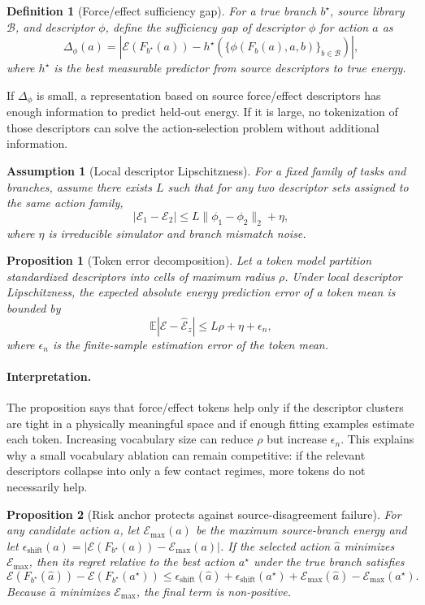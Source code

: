 \documentclass{article}
\newtheorem{proposition}{Proposition}
\newtheorem{assumption}{Assumption}
\newtheorem{definition}{Definition}
\newcommand{\energy}{\mathcal{E}}
\newcommand{\branches}{\mathcal{B}}
\newcommand{\features}{\phi}
\begin{document}
\begin{definition}[Force/effect sufficiency gap]
For a true branch $b^\star$, source library $\branches$, and descriptor $\features$, define the sufficiency gap of descriptor $\features$ for action $a$ as
\[
  \Delta_{\features}(a)
  =
  \left|
    \energy(F_{b^\star}(a))
    -
    h^\star(\{\features(F_b(a),a,b)\}_{b\in\branches})
  \right|,
\]
where $h^\star$ is the best measurable predictor from source descriptors to true energy.
\end{definition}

If $\Delta_{\features}$ is small, a representation based on source force/effect descriptors has enough information to predict held-out energy. If it is large, no tokenization of those descriptors can solve the action-selection problem without additional information.

\begin{assumption}[Local descriptor Lipschitzness]
For a fixed family of tasks and branches, assume there exists $L$ such that for any two descriptor sets assigned to the same action family,
\[
  |\energy_1-\energy_2| \leq L\|\features_1-\features_2\|_2 + \eta,
\]
where $\eta$ is irreducible simulator and branch mismatch noise.
\end{assumption}

\begin{proposition}[Token error decomposition]
Let a token model partition standardized descriptors into cells of maximum radius $\rho$. Under local descriptor Lipschitzness, the expected absolute energy prediction error of a token mean is bounded by
\[
  \mathbb{E}|\energy-\hat{\energy}_z|
  \leq L\rho + \eta + \epsilon_n,
\]
where $\epsilon_n$ is the finite-sample estimation error of the token mean.
\end{proposition}

\paragraph{Interpretation.}
The proposition says that force/effect tokens help only if the descriptor clusters are tight in a physically meaningful space and if enough fitting examples estimate each token. Increasing vocabulary size can reduce $\rho$ but increase $\epsilon_n$. This explains why a small vocabulary ablation can remain competitive: if the relevant descriptors collapse into only a few contact regimes, more tokens do not necessarily help.

\begin{proposition}[Risk anchor protects against source-disagreement failure]
For any candidate action $a$, let $\energy_{\max}(a)$ be the maximum source-branch energy and let $\epsilon_{\mathrm{shift}}(a)=|\energy(F_{b^\star}(a))-\energy_{\max}(a)|$. If the selected action $\hat a$ minimizes $\energy_{\max}$, then its regret relative to the best action $a^\star$ under the true branch satisfies
\[
  \energy(F_{b^\star}(\hat a))-\energy(F_{b^\star}(a^\star))
  \leq
  \epsilon_{\mathrm{shift}}(\hat a)
  +\epsilon_{\mathrm{shift}}(a^\star)
  +\energy_{\max}(\hat a)-\energy_{\max}(a^\star).
\]
Because $\hat a$ minimizes $\energy_{\max}$, the final term is non-positive.
\end{proposition}
\end{document}

